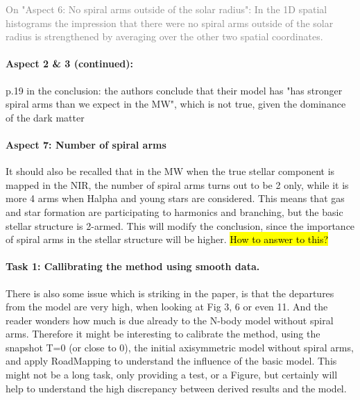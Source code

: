 \documentclass[10pt,a4paper]{article}
\newcommand{\Answer}[1]{\textcolor{Gray}{#1}}
\begin{document}
\Answer{On "Aspect 6: No spiral arms outside of the solar radius": In the 1D spatial histograms the impression that there were no spiral arms outside of the solar radius is strengthened by averaging over the other two spatial coordinates.}

\paragraph{Aspect 2 \& 3 (continued):} p.19 in the conclusion: the authors conclude that their model has "has stronger spiral arms than we expect in the MW", which is not true, given the dominance of
the dark matter

\paragraph{Aspect 7: Number of spiral arms} It should also be recalled that in the MW when the true stellar component is mapped
in the NIR, the number of spiral arms turns out to be 2 only, while it is more 4
arms when Halpha and young stars are considered. This means that gas and star
formation are participating to harmonics and branching, but the basic stellar
structure is 2-armed. This will modify the conclusion, since the importance of
spiral arms in the stellar structure will be higher. \hl{How to answer to this?}

\paragraph{Task 1: Callibrating the method using smooth data.} There is also some issue which is striking in the paper, is that the departures from
the model are very high, when looking at Fig 3, 6 or even 11. And the reader wonders
how much is due already to the N-body model without spiral arms. Therefore it might
be interesting to calibrate the method, using the snapshot T=0 (or close to 0), the
initial axisymmetric model without spiral arms, and apply RoadMapping to understand
the  influence of the basic model. This might not be a long task, only providing a
test, or a Figure, but certainly will help to understand the high discrepancy
between derived results and the model.
\end{document}
